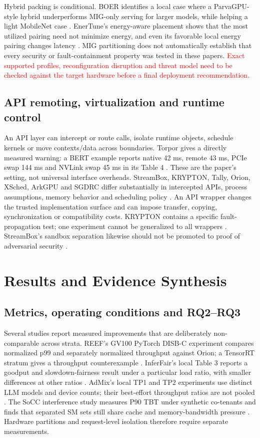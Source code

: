 \documentclass[12pt,a4paper]{article}
\newcommand{\red}[1]{\textcolor{red}{#1}}
\begin{document}
Hybrid packing is conditional. BOER identifies a local case where a ParvaGPU-style hybrid underperforms MIG-only serving for larger models, while helping a light MobileNet case \cite{boer}. EnerTune's energy-aware placement shows that the most utilized pairing need not minimize energy, and even its favorable local energy pairing changes latency \cite{enertune}. MIG partitioning does not automatically establish that every security or fault-containment property was tested in these papers. \red{Exact supported profiles, reconfiguration disruption and threat model need to be checked against the target hardware before a final deployment recommendation.}

\subsection{API remoting, virtualization and runtime control}
An API layer can intercept or route calls, isolate runtime objects, schedule kernels or move contexts/data across boundaries. Torpor gives a directly measured warning: a BERT example reports native 42 ms, remote 43 ms, PCIe swap 144 ms and NVLink swap 45 ms in its Table 4 \cite{torpor}. These are the paper's setting, not universal interface overheads. StreamBox, KRYPTON, Tally, Orion, XSched, ArkGPU and SGDRC differ substantially in intercepted APIs, process assumptions, memory behavior and scheduling policy \cite{streambox,krypton,tally,orion,xsched,arkgpu,sgdrc}. An API wrapper changes the trusted implementation surface and can impose transfer, copying, synchronization or compatibility costs. KRYPTON contains a specific fault-propagation test; one experiment cannot be generalized to all wrappers \cite{krypton}. StreamBox's sandbox separation likewise should not be promoted to proof of adversarial security \cite{streambox}.

\section{Results and Evidence Synthesis}
\subsection{Metrics, operating conditions and RQ2--RQ3}
Several studies report measured improvements that are deliberately non-comparable across strata. REEF's GV100 PyTorch DISB-C experiment compares normalized p99 and separately normalized throughput against Orion; a TensorRT stratum gives a throughput counterexample \cite{reef}. InferFair's local Table 3 reports a goodput and slowdown-fairness result under a particular load ratio, with smaller differences at other ratios \cite{inferfair}. AdMix's local TP1 and TP2 experiments use distinct LLM models and device counts; their best-effort throughput ratios are not pooled \cite{admix}. The SoCC interference study measures P90 TBT under synthetic co-tenants and finds that separated SM sets still share cache and memory-bandwidth pressure \cite{interference_deeper}. Hardware partitions and request-level isolation therefore require separate measurements.
\end{document}

